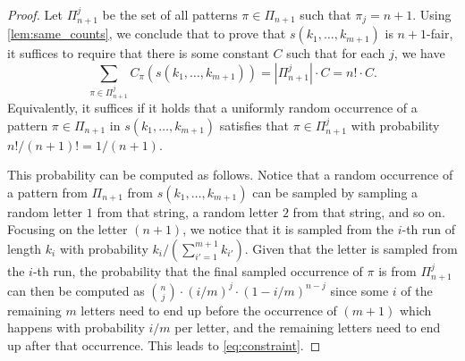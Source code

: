 \documentclass{article}
\begin{document}
\begin{proof}
Let $\Pi_{n+1}^j$ be the set of all patterns $\pi \in \Pi_{n+1}$ such that $\pi_j = n+1$. 
Using \cref{lem:same_counts}, we conclude that to prove that $s(k_1, \dots, k_{m+1})$ is $n+1$-fair, it suffices to require that there is some constant $C$ such that for each $j$, we have 
\[
\sum_{\pi \in \Pi_{n+1}^j} C_\pi(s(k_1, \dots, k_{m+1})) = |\Pi_{n+1}^j| \cdot C = n! \cdot C. 
\]
Equivalently, it suffices if it holds that a uniformly random occurrence of a pattern $\pi \in \Pi_{n+1}$ in $s(k_1, \dots, k_{m+1})$ satisfies that $\pi \in \Pi_{n+1}^j$ with probability $n! / (n+1)! = 1/(n+1)$. 

This probability can be computed as follows. Notice that a random occurrence of a pattern from $\Pi_{n+1}$ from $s(k_1, \dots, k_{m+1})$ can be sampled by sampling a random letter $1$ from that string, a random letter $2$ from that string, and so on.  Focusing on the letter $(n+1)$, we notice that it is sampled from the $i$-th run of length $k_i$ with probability $k_i / (\sum_{i' = 1}^{m+1} k_{i'})$. Given that the letter is sampled from the $i$-th run, the probability that the final sampled occurrence of $\pi$ is from $\Pi_{n+1}^j$ can then be computed as $\binom{n}{j} \cdot (i/m)^j \cdot (1 - i/m)^{n-j}$ since some $i$ of the remaining $m$ letters need to end up before the occurrence of $(m+1)$ which happens with probability $i/m$ per letter, and the remaining letters need to end up after that occurrence. This leads to \cref{eq:constraint}. 
\end{proof}
\end{document}
